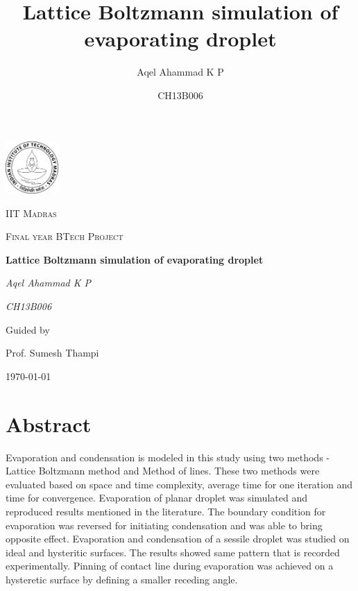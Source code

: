 \documentclass{article}
\title{Lattice Boltzmann simulation of evaporating droplet}
\date{CH13B006}
\author{Aqel Ahammad K P}
\begin{document}
\begin{titlepage}
			\centering
			\includegraphics[width=0.15\textwidth]{images/others/iitm_logo}\par\vspace{1cm}
			{\scshape\LARGE IIT Madras \par}
			\vspace{1cm}
			{\scshape\Large Final year BTech Project\par}
			\vspace{1.5cm}
			{\huge\bfseries Lattice Boltzmann simulation of evaporating droplet\par}
			\vspace{2cm}
			{\Large\itshape Aqel Ahammad K P\par}
			{\Large\itshape CH13B006\par}
			\vfill
			Guided by\par
			Prof. Sumesh Thampi
			
			\vfill
			
			{\large \today\par}
		\end{titlepage}
\tableofcontents
{}
\newpage
{}

\section{Abstract}
Evaporation and condensation is modeled in this study using two methods - Lattice Boltzmann method and Method of lines. These two methods were evaluated based on space and time complexity, average time for one iteration and time for convergence. Evaporation of planar droplet was simulated and reproduced results mentioned in the literature. The boundary condition for evaporation was reversed for initiating condensation and was able to bring opposite effect. Evaporation and condensation of a sessile droplet was studied on ideal and hysteritic surfaces. The results showed same pattern that is recorded experimentally. Pinning of contact line during evaporation was achieved on a hysteretic surface by defining a smaller receding angle. 
\end{document}
